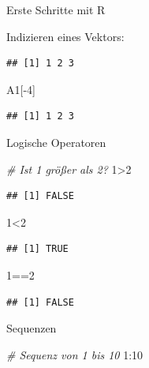 \documentclass[ignorenonframetext,]{beamer}
\newenvironment{Shaded}{}{}
\newcommand{\DecValTok}[1]{\textcolor[rgb]{0.25,0.63,0.44}{{#1}}}
\newcommand{\CommentTok}[1]{\textcolor[rgb]{0.38,0.63,0.69}{\textit{{#1}}}}
\newcommand{\NormalTok}[1]{{#1}}
\begin{document}
\begin{frame}[fragile]{Erste Schritte mit R}
\begin{block}{Indizieren eines Vektors:}
\begin{verbatim}
## [1] 1 2 3
\end{verbatim}

\begin{Shaded}
\begin{Highlighting}[]
\NormalTok{A1[-}\DecValTok{4}\NormalTok{]}
\end{Highlighting}
\end{Shaded}

\begin{verbatim}
## [1] 1 2 3
\end{verbatim}

\end{block}

\begin{block}{Logische Operatoren}

\begin{Shaded}
\begin{Highlighting}[]
\CommentTok{# Ist 1 größer als 2?}
\DecValTok{1}\NormalTok{>}\DecValTok{2}
\end{Highlighting}
\end{Shaded}

\begin{verbatim}
## [1] FALSE
\end{verbatim}

\begin{Shaded}
\begin{Highlighting}[]
\DecValTok{1}\NormalTok{<}\DecValTok{2}
\end{Highlighting}
\end{Shaded}

\begin{verbatim}
## [1] TRUE
\end{verbatim}

\begin{Shaded}
\begin{Highlighting}[]
\DecValTok{1}\NormalTok{==}\DecValTok{2}
\end{Highlighting}
\end{Shaded}

\begin{verbatim}
## [1] FALSE
\end{verbatim}

\end{block}

\begin{block}{Sequenzen}

\begin{Shaded}
\begin{Highlighting}[]
\CommentTok{# Sequenz von 1 bis 10}
\DecValTok{1}\NormalTok{:}\DecValTok{10}
\end{Highlighting}
\end{Shaded}


\end{block}
\end{frame}
\end{document}
